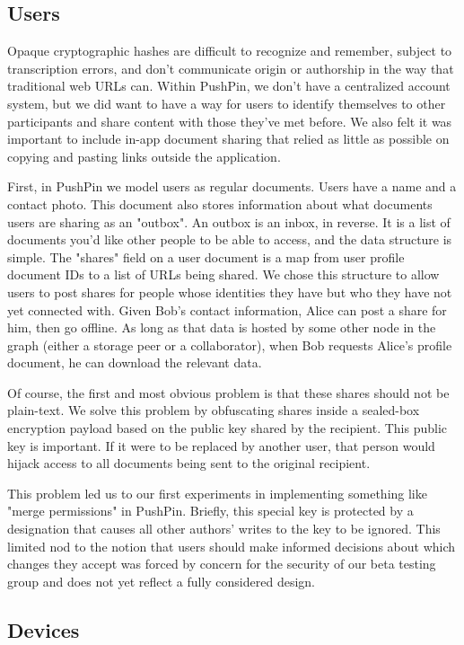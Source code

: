 \documentclass[sigplan,10pt]{acmart}
\begin{document}
\subsection{Users}

Opaque cryptographic hashes are difficult to recognize and remember, subject to transcription errors, and don't communicate origin or authorship in the way that traditional web URLs can. Within PushPin, we don't have a centralized account system, but we did want to have a way for users to identify themselves to other participants and share content with those they've met before. We also felt it was important to include in-app document sharing that relied as little as possible on copying and pasting links outside the application.

First, in PushPin we model users as regular documents. Users have a name and a contact photo. This document also stores information about what documents users are sharing as an "outbox". An outbox is an inbox, in reverse. It is a list of documents you'd like other people to be able to access, and the data structure is simple. The "shares" field on a user document is a map from user profile document IDs to a list of URLs being shared. We chose this structure to allow users to post shares for people whose identities they have but who they have not yet connected with. Given Bob's contact information, Alice can post a share for him, then go offline. As long as that data is hosted by some other node in the graph (either a storage peer or a collaborator), when Bob requests Alice's profile document, he can download the relevant data.

Of course, the first and most obvious problem is that these shares should not be plain-text. We solve this problem by obfuscating shares inside a sealed-box encryption payload based on the public key shared by the recipient. This public key is important. If it were to be replaced by another user, that person would hijack access to all documents being sent to the original recipient.

This problem led us to our first experiments in implementing something like "merge permissions" in PushPin. Briefly, this special key is protected by a designation that causes all other authors' writes to the key to be ignored. This limited nod to the notion that users should make informed decisions about which changes they accept was forced by concern for the security of our beta testing group and does not yet reflect a fully considered design.

\subsection{Devices}
\end{document}
